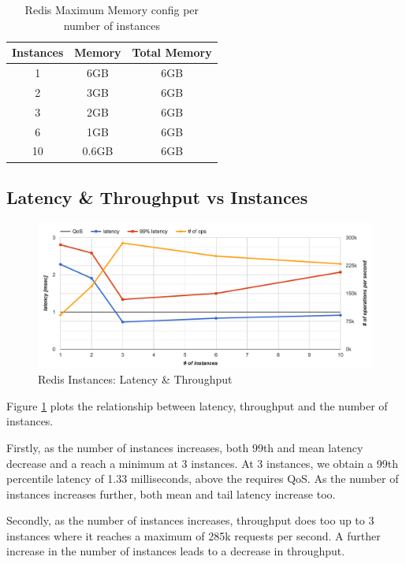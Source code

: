 \begin{table}[h!]
\centering
\begin{tabular}{| c c c |}
 \hline
 Instances & Memory & Total Memory\\ [0.5ex]
 \hline\hline

 1  & 6GB & 6GB \\
 2  & 3GB & 6GB \\
 3  & 2GB & 6GB \\
 6  &  1GB & 6GB \\
 10 &  0.6GB & 6GB \\
 \hline

\end{tabular}
\caption{Redis Maximum Memory config per number of instances}
\label{tab:redis_instances}
\end{table}


\subsection{Latency \& Throughput vs Instances}
\begin{figure}[h]
    \includegraphics[width=\textwidth]{./res2/r_instances_latency.png}
    \caption{Redis Instances: Latency \& Throughput}
    \label{fig:r_instances_latency}
\end{figure}

Figure \ref{fig:r_instances_latency} plots the relationship between latency, throughput and the number of instances.

Firstly, as the number of instances increases, both 99th and mean latency decrease and a reach a minimum at 3 instances. At 3 instances, we obtain a 99th percentile latency of 1.33 milliseconds, above the requires QoS. As the number of instances increases further, both mean and tail latency increase too.

Secondly, as the number of instances increases, throughput does too up to 3 instances where it reaches a maximum of 285k requests per second. A further increase in the number of instances leads to a decrease in throughput.

